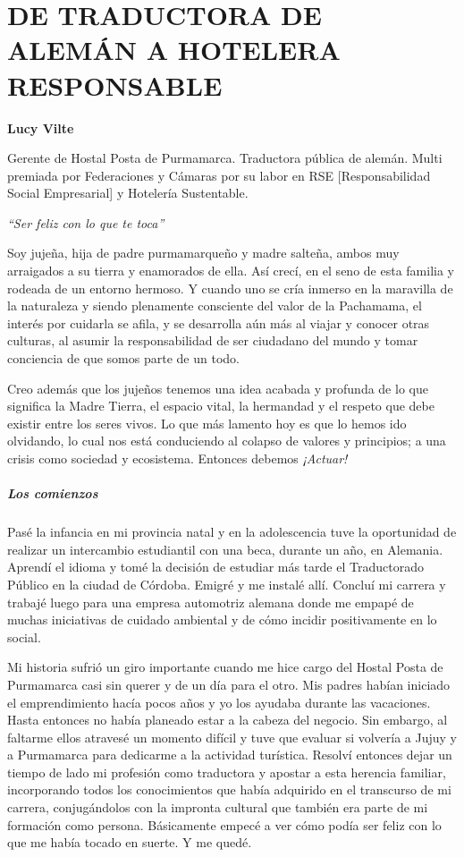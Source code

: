 \documentclass[
]{article}
\begin{document}
\cleardoublepage

\hypertarget{de-traductora-de-alemuxe1n-a-hotelera-responsable}{%
\section{DE TRADUCTORA DE ALEMÁN A HOTELERA
RESPONSABLE}\label{de-traductora-de-alemuxe1n-a-hotelera-responsable}}

\textbf{Lucy Vilte}

Gerente de Hostal Posta de Purmamarca. Traductora pública de alemán.
Multi premiada por Federaciones y Cámaras por su labor en RSE
{[}Responsabilidad Social Empresarial{]} y Hotelería Sustentable.

\emph{``Ser feliz con lo que te toca''}

Soy jujeña, hija de padre purmamarqueño y madre salteña, ambos muy
arraigados a su tierra y enamorados de ella. Así crecí, en el seno de
esta familia y rodeada de un entorno hermoso. Y cuando uno se cría
inmerso en la maravilla de la naturaleza y siendo plenamente consciente
del valor de la Pachamama, el interés por cuidarla se afila, y se
desarrolla aún más al viajar y conocer otras culturas, al asumir la
responsabilidad de ser ciudadano del mundo y tomar conciencia de que
somos parte de un todo.

Creo además que los jujeños tenemos una idea acabada y profunda de lo
que significa la Madre Tierra, el espacio vital, la hermandad y el
respeto que debe existir entre los seres vivos. Lo que más lamento hoy
es que lo hemos ido olvidando, lo cual nos está conduciendo al colapso
de valores y principios; a una crisis como sociedad y ecosistema.
Entonces debemos \emph{¡Actuar!}

\hypertarget{los-comienzos-1}{%
\subparagraph{Los comienzos}\label{los-comienzos-1}}

Pasé la infancia en mi provincia natal y en la adolescencia tuve la
oportunidad de realizar un intercambio estudiantil con una beca, durante
un año, en Alemania. Aprendí el idioma y tomé la decisión de estudiar
más tarde el Traductorado Público en la ciudad de Córdoba. Emigré y me
instalé allí. Concluí mi carrera y trabajé luego para una empresa
automotriz alemana donde me empapé de muchas iniciativas de cuidado
ambiental y de cómo incidir positivamente en lo social.

Mi historia sufrió un giro importante cuando me hice cargo del Hostal
Posta de Purmamarca casi sin querer y de un día para el otro. Mis padres
habían iniciado el emprendimiento hacía pocos años y yo los ayudaba
durante las vacaciones. Hasta entonces no había planeado estar a la
cabeza del negocio. Sin embargo, al faltarme ellos atravesé un momento
difícil y tuve que evaluar si volvería a Jujuy y a Purmamarca para
dedicarme a la actividad turística. Resolví entonces dejar un tiempo de
lado mi profesión como traductora y apostar a esta herencia familiar,
incorporando todos los conocimientos que había adquirido en el
transcurso de mi carrera, conjugándolos con la impronta cultural que
también era parte de mi formación como persona. Básicamente empecé a ver
cómo podía ser feliz con lo que me había tocado en suerte. Y me quedé.
\end{document}

